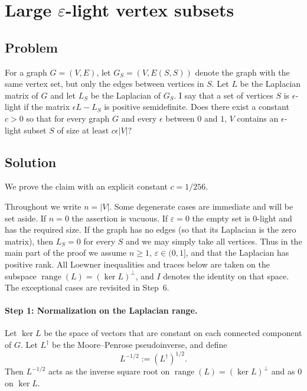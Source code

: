 \documentclass{article}
\title{}
\date{}
\begin{document}
\section{Large $\varepsilon$-light vertex subsets}

\subsection*{Problem}

For a graph $G = (V, E)$, let $G_S = (V, E(S,S))$ denote the graph with the same vertex set,
but only the edges between vertices in $S$. Let $L$ be the Laplacian matrix of $G$ and let $L_S$
be the Laplacian of $G_S$. I say that a set of vertices $S$ is $\epsilon$-light if the matrix
$\epsilon L - L_S$ is positive semidefinite. Does there exist a constant $c > 0$ so that for every
graph $G$ and every $\epsilon$ between $0$ and $1$, $V$ contains an $\epsilon$-light subset $S$ of size
at least $c\epsilon|V|$?

\subsection*{Solution}

We prove the claim with an explicit constant $c = 1/256$.

Throughout we write $n = |V|$. Some degenerate cases are immediate and will be set aside.
If $n = 0$ the assertion is vacuous. If $\varepsilon = 0$ the empty set is $0$-light and has the required
size. If the graph has no edges (so that its Laplacian is the zero matrix), then $L_S = 0$ for
every $S$ and we may simply take all vertices. Thus in the main part of the proof we assume
$n \ge 1$, $\varepsilon \in (0,1]$, and that the Laplacian has positive rank. All Loewner inequalities
and traces below are taken on the subspace $\operatorname{range}(L) = (\ker L)^\perp$, and $I$ denotes the
identity on that space. The exceptional cases are revisited in Step~6.

\paragraph{Step 1: Normalization on the Laplacian range.}
Let $\ker L$ be the space of vectors that are constant on each connected component of $G$.
Let $L^\dagger$ be the Moore--Penrose pseudoinverse, and define
\[
  L^{-1/2} := (L^\dagger)^{1/2}.
\]
Then $L^{-1/2}$ acts as the inverse square root on $\operatorname{range}(L) = (\ker L)^\perp$ and as $0$ on $\ker L$.
\end{document}

